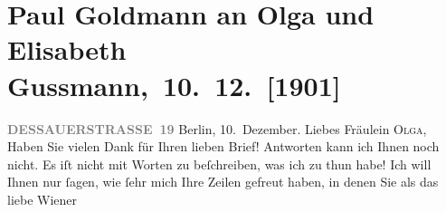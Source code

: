 

         
         \renewcommand{\erwaehntePersonen}{Personen: Alfred Gold, Paul Goldmann, Gerhart Hauptmann,  Kohrl, Johanna Mamroth, Fedor Mamroth, Paul Marx, Olga Schnitzler, Elisabeth Steinrück}
         \renewcommand{\erwaehnteInstitutionen}{Institutionen: Frankfurter Zeitung}
         \renewcommand{\erwaehnteOrte}{Orte: ?? [Wohnung von Olga und Elisabeth Gussmann, 1901/1902], Berlin, Dessauer Straße, Grünentorgasse, Hauptstraße 56, Südtirol, Tirol, Wien}
         \renewcommand{\erwaehnteWerke}{Werke: Barcarole, Der rothe Hahn. Tragikomödie in vier Akten, Hoffmanns Erzählungen}
               \section[ Paul Goldmann an Olga und Elisabeth Gussmann, 10. 12. {[}1901{]}]{ Paul Goldmann an Olga und Elisabeth Gussmann, 10. 12. {[}1901{]}}\nopagebreak{}\rehead{ }\begin{ledgroupsized}[t]{13cm}\normalsize\beginnumbering{} \toendnotes[C]{\smallbreak\pagebreak[2]} 
\toendnotes[C]{\smallbreak}\pstart
           \noindent{}\raggedleft{}{\pb}\textcolor{gray}{\textbf{DESSAUERSTRASSE 19}}\pend
           \pstart
           Berlin, 10. Dezember.\pend
           \pstart\center{}Liebes Fräulein \textsc{Olga},\pend\pstart
           Haben Sie vielen Dank für Ihren lieben Brief! Antworten kann ich Ihnen noch nicht. Es
               iſt nicht mit Worten zu beſchreiben, was ich zu thun habe! Ich will Ihnen nur ſagen,
               wie ſehr mich Ihre Zeilen gefreut  haben, in denen Sie als das liebe Wiener

\end{ledgroupsized}
